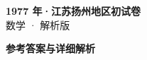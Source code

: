 \documentclass[zihao=-4, a4paper]{ctexart}
\begin{document}
\begin{center}
  {\Large\bfseries 1977 年·江苏扬州地区初试卷}\\[4pt]
  {\large 数学 · 解析版}
\end{center}
\medskip
{}

\clearpage
{}
\begin{center}{\Large\bfseries 参考答案与详细解析}\end{center}
\medskip

\end{document}

